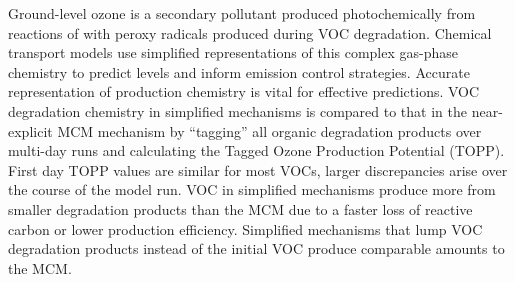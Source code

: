 Ground-level ozone is a secondary pollutant produced photochemically from reactions of  with peroxy radicals produced during VOC degradation. 
Chemical transport models use simplified representations of this complex gas-phase chemistry to predict  levels and inform emission control strategies. 
Accurate representation of  production chemistry is vital for effective predictions.
VOC degradation chemistry in simplified mechanisms is compared to that in the near-explicit MCM mechanism by ``tagging'' all organic degradation products over multi-day runs and calculating the Tagged Ozone Production Potential (TOPP). 
First day TOPP values are similar for most VOCs, larger discrepancies arise over the course of the model run. 
VOC in simplified mechanisms produce more  from smaller degradation products than the MCM due to a faster loss of reactive carbon or lower  production efficiency.
Simplified mechanisms that lump VOC degradation products instead of the initial VOC produce comparable  amounts to the MCM.
